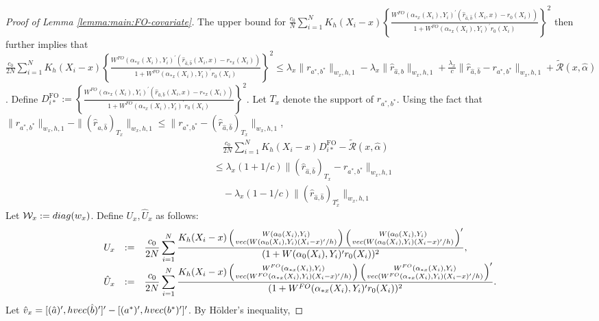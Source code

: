 \documentclass[11pt]{article}
\begin{document}
\begin{proof}[Proof of Lemma \ref{lemma:main:FO-covariate}]
The upper bound for $\frac{c_0}{N}\sum_{i=1}^NK_h(X_i-x)\left\{\frac{W^{FO}(\alpha_{*x}(X_i),Y_i)^\prime(\hat{r}_{\hat a,\hat b}(X_i,x)-r_0(X_i))}{1+W^{FO}(\alpha_{*x}(X_i),Y_i)^\prime r_0(X_i)}\right\}^2$ then further implies that $\frac{c_0}{2N} \sum_{i=1}^NK_h(X_i-x)\left\{\frac{W^{FO}(\alpha_{*x}(X_i),Y_i)^\prime(\hat{r}_{\hat a, \hat b}(X_i,x)-r_{*x}(X_i))}{1+W^{FO}(\alpha_{*x}(X_i),Y_i)^\prime r_0(X_i)}\right\}^2\leq \lambda_x\|r_{a^*,b^*}\|_{w_x,h,1} -  \lambda_x\|\hat r_{\hat a,\hat b}\|_{w_x,h,1} + \frac{\lambda_x}{c}\|\hat r_{\hat a,\hat b} - r_{a^*,b^*}\|_{w_x,h,1}   + \widetilde{\mathcal{R}}(x,\hat{\alpha})$. Define $\displaystyle D_{i*}^{\mathrm{FO}}:=\left\{\frac{W^{FO}(\alpha_{*x}(X_i),Y_i)^\prime(\hat{r}_{\hat a, \hat b}(X_i,x)-r_{*x}(X_i))}{1+W^{FO}(\alpha_{*x}(X_i),Y_i)^\prime r_0(X_i)}\right\}^2$. Let $T_x$ denote the support of $r_{a^*,b^*}$. Using the fact that $\|r_{a^*,b^*}\|_{w_x,h,1} - \|(\hat r_{\hat a,\hat b})_{T_x}\|_{w_x,h,1}\leq\|r_{a^*,b^*}-(\hat r_{\hat a,\hat b})_{T_x}\|_{w_x,h,1}$, 
\begin{equation}\label{ineq:*:ineq}
\begin{array}{rl}
&\displaystyle\quad\frac{c_0}{2N} \sum_{i=1}^NK_h(X_i-x)D_{i*}^{\mathrm{FO}}-\widetilde{\mathcal{R}}(x,\hat{\alpha})\\ 
&\displaystyle \leq \lambda_x(1+1/c)\|(\hat r_{\hat a,\hat b})_{T_x} - r_{a^*,b^*}\|_{w_x,h,1}\\
&\quad\displaystyle-\lambda_x(1-1/c)\|(\hat r_{\hat a,\hat b})_{T_x^c}\|_{w_x,h,1}
\end{array}
\end{equation}
Let $\mathcal{W}_x:={\rm diag}(w_x)$. Define $U_x,\hat{U}_x$ as follows: 
$$\begin{array}{rcl}
U_x&:=&\displaystyle\frac{c_0}{2N}\sum_{i=1}^N\displaystyle\frac{K_h(X_i-x)\left( {W(\alpha_0(X_i),Y_i)}\atop{ {\rm vec}( W(\alpha_0(X_i),Y_i) (X_i-x)'/h)}\right)\left( {W(\alpha_0(X_i),Y_i)}\atop{ {\rm vec}( W(\alpha_0(X_i),Y_i) (X_i-x)'/h)}\right)'}{(1+W(\alpha_0(X_i),Y_i)^\prime r_0(X_i))^2},\\
\hat{U}_x&:=&\displaystyle\frac{c_0}{2N}\sum_{i=1}^N\frac{K_h(X_i-x)\left( {W^{FO}(\alpha_{*x}(X_i),Y_i)}\atop{ {\rm vec}( W^{FO}(\alpha_{*x}(X_i),Y_i) (X_i-x)'/h)}\right)\left( {W^{FO}(\alpha_{*x}(X_i),Y_i)}\atop{ {\rm vec}( W^{FO}(\alpha_{*x}(X_i),Y_i) (X_i-x)'/h)}\right)'}{(1+W^{FO}(\alpha_{*x}(X_i),Y_i)^\prime r_0(X_i))^2}.
\end{array}$$ 
Let $\hat v_x = [ (\hat a)', h{\rm vec}(\hat b)' ]' - [ (a^{*})', h{\rm vec}(b^*)']'$. By H\"older's inequality, 

\end{proof}
\end{document}
